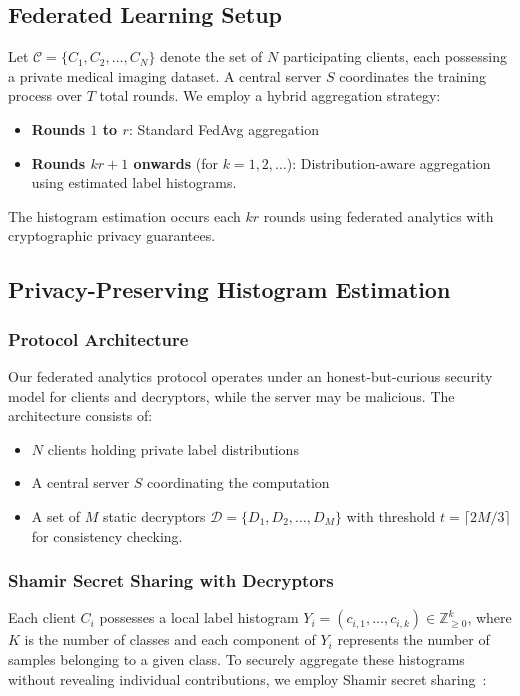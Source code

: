 \documentclass[runningheads]{llncs}
\begin{document}
\subsection{Federated Learning Setup}

Let $\mathcal{C} = \{C_1, C_2, \ldots, C_N\}$ denote the set of $N$ participating clients, each possessing a private medical imaging dataset. A central server $S$ coordinates the training process over $T$ total rounds. We employ a hybrid aggregation strategy:
\begin{itemize}
    \item \textbf{Rounds $1$ to $r$}: Standard FedAvg aggregation
    \item \textbf{Rounds $kr+1$ onwards} (for $k = 1, 2, \ldots$): Distribution-aware aggregation using estimated label histograms.
\end{itemize}

The histogram estimation occurs each $kr$ rounds using federated analytics with cryptographic privacy guarantees.

\subsection{Privacy-Preserving Histogram Estimation}

\subsubsection{Protocol Architecture}

Our federated analytics protocol operates under an honest-but-curious security model for clients and decryptors, while the server may be malicious. The architecture consists of:
\begin{itemize}
    \item $N$ clients holding private label distributions
    \item A central server $S$ coordinating the computation
    \item A set of $M$ static decryptors $\mathcal{D} = \{D_1, D_2, \ldots, D_M\}$ with threshold $t = \lceil 2M/3 \rceil$ for consistency checking.
\end{itemize}

\subsubsection{Shamir Secret Sharing with Decryptors}

Each client $C_i$ possesses a local label histogram $Y_i = (c_{i,1},\dots,c_{i,k}) \in \mathbb{Z}_{\ge 0}^k$, where $K$ is the number of classes and each component of $Y_i$ represents the number of samples belonging to a given class. To securely aggregate these histograms without revealing individual contributions, we employ Shamir secret sharing~\cite{flamingo2023}:
\end{document}
